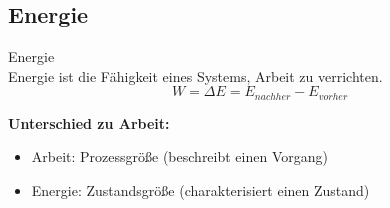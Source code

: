\subsection{Energie}

\begin{definition}{Energie}\\
    Energie ist die Fähigkeit eines Systems, Arbeit zu verrichten.
    \begin{equation}
        W = \Delta E = E_{nachher} - E_{vorher}
    \end{equation}
    
    \textbf{Unterschied zu Arbeit:}
    \begin{itemize}
        \item Arbeit: Prozessgröße (beschreibt einen Vorgang)
        \item Energie: Zustandsgröße (charakterisiert einen Zustand)
    \end{itemize}
\end{definition}

